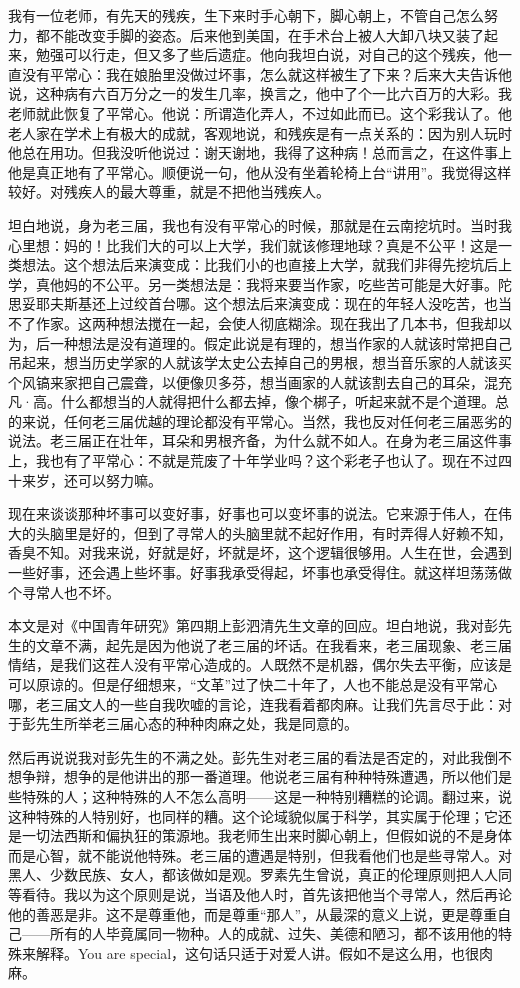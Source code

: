 我有一位老师，有先天的残疾，生下来时手心朝下，脚心朝上，不管自己怎么努力，都不能改变手脚的姿态。后来他到美国，在手术台上被人大卸八块又装了起来，勉强可以行走，但又多了些后遗症。他向我坦白说，对自己的这个残疾，他一直没有平常心：我在娘胎里没做过坏事，怎么就这样被生了下来？后来大夫告诉他说，这种病有六百万分之一的发生几率，换言之，他中了个一比六百万的大彩。我老师就此恢复了平常心。他说：所谓造化弄人，不过如此而已。这个彩我认了。他老人家在学术上有极大的成就，客观地说，和残疾是有一点关系的：因为别人玩时他总在用功。但我没听他说过：谢天谢地，我得了这种病！总而言之，在这件事上他是真正地有了平常心。顺便说一句，他从没有坐着轮椅上台“讲用”。我觉得这样较好。对残疾人的最大尊重，就是不把他当残疾人。　 

坦白地说，身为老三届，我也有没有平常心的时候，那就是在云南挖坑时。当时我心里想：妈的！比我们大的可以上大学，我们就该修理地球？真是不公平！这是一类想法。这个想法后来演变成：比我们小的也直接上大学，就我们非得先挖坑后上学，真他妈的不公平。另一类想法是：我将来要当作家，吃些苦可能是大好事。陀思妥耶夫斯基还上过绞首台哪。这个想法后来演变成：现在的年轻人没吃苦，也当不了作家。这两种想法搅在一起，会使人彻底糊涂。现在我出了几本书，但我却以为，后一种想法是没有道理的。假定此说是有理的，想当作家的人就该时常把自己吊起来，想当历史学家的人就该学太史公去掉自己的男根，想当音乐家的人就该买个风镐来家把自己震聋，以便像贝多芬，想当画家的人就该割去自己的耳朵，混充凡·高。什么都想当的人就得把什么都去掉，像个梆子，听起来就不是个道理。总的来说，任何老三届优越的理论都没有平常心。当然，我也反对任何老三届恶劣的说法。老三届正在壮年，耳朵和男根齐备，为什么就不如人。在身为老三届这件事上，我也有了平常心：不就是荒废了十年学业吗？这个彩老子也认了。现在不过四十来岁，还可以努力嘛。　 

现在来谈谈那种坏事可以变好事，好事也可以变坏事的说法。它来源于伟人，在伟大的头脑里是好的，但到了寻常人的头脑里就不起好作用，有时弄得人好赖不知，香臭不知。对我来说，好就是好，坏就是坏，这个逻辑很够用。人生在世，会遇到一些好事，还会遇上些坏事。好事我承受得起，坏事也承受得住。就这样坦荡荡做个寻常人也不坏。　 

本文是对《中国青年研究》第四期上彭泗清先生文章的回应。坦白地说，我对彭先生的文章不满，起先是因为他说了老三届的坏话。在我看来，老三届现象、老三届情结，是我们这茬人没有平常心造成的。人既然不是机器，偶尔失去平衡，应该是可以原谅的。但是仔细想来，“文革”过了快二十年了，人也不能总是没有平常心哪，老三届文人的一些自我吹嘘的言论，连我看着都肉麻。让我们先言尽于此：对于彭先生所举老三届心态的种种肉麻之处，我是同意的。　 

然后再说说我对彭先生的不满之处。彭先生对老三届的看法是否定的，对此我倒不想争辩，想争的是他讲出的那一番道理。他说老三届有种种特殊遭遇，所以他们是些特殊的人；这种特殊的人不怎么高明——这是一种特别糟糕的论调。翻过来，说这种特殊的人特别好，也同样的糟。这个论域貌似属于科学，其实属于伦理；它还是一切法西斯和偏执狂的策源地。我老师生出来时脚心朝上，但假如说的不是身体而是心智，就不能说他特殊。老三届的遭遇是特别，但我看他们也是些寻常人。对黑人、少数民族、女人，都该做如是观。罗素先生曾说，真正的伦理原则把人人同等看待。我以为这个原则是说，当语及他人时，首先该把他当个寻常人，然后再论他的善恶是非。这不是尊重他，而是尊重“那人”，从最深的意义上说，更是尊重自己——所有的人毕竟属同一物种。人的成就、过失、美德和陋习，都不该用他的特殊来解释。You are special，这句话只适于对爱人讲。假如不是这么用，也很肉麻。

